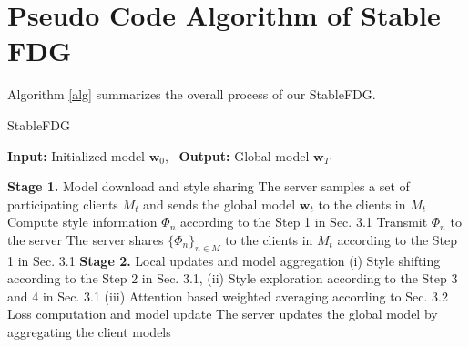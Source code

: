 \documentclass{article}
\theoremstyle{plain}
\theoremstyle{definition}
\theoremstyle{remark}
\begin{document}
\section{Pseudo Code Algorithm of Stable FDG}
Algorithm \ref{alg} summarizes the overall process of our StableFDG.
\begin{algorithm*}\caption{StableFDG }\label{alg}
\textbf{Input:} Initialized model $\mathbf{w}_0$, \ \textbf{Output:} Global model $\mathbf{w}_T$
	\begin{algorithmic}[1]
		\STATE
		\STATE \textbf{Stage 1.} Model download and style sharing
		\STATE The server samples a set of participating clients $M_t$ and sends the global model  $\mathbf{w}_t$ to the clients in $M_t$  
			\STATE Compute   style information $\Phi_n$ according to the Step 1 in Sec. 3.1
			\STATE Transmit    $\Phi_n$ to the server
		\ENDFOR
			\STATE The server shares $\{\Phi_{n}\}_{n \in M}$ to the clients in $M_t$ according to the Step 1 in Sec. 3.1
		\STATE
		\STATE \textbf{Stage 2.} Local  updates and model aggregation		
			\STATE  (i) Style shifting according to the Step 2 in Sec.  3.1, 
				\STATE (ii) Style exploration  according to the Step 3 and 4 in Sec.  3.1
				\STATE  (iii) Attention based weighted averaging according to 	Sec. 3.2
			\STATE   Loss computation and model update
			\ENDFOR
			\STATE The server updates the global model by aggregating the client models 
			\ENDFOR
		
		\STATE
	\ENDFOR
	\end{algorithmic}
\end{algorithm*}






\end{document}

